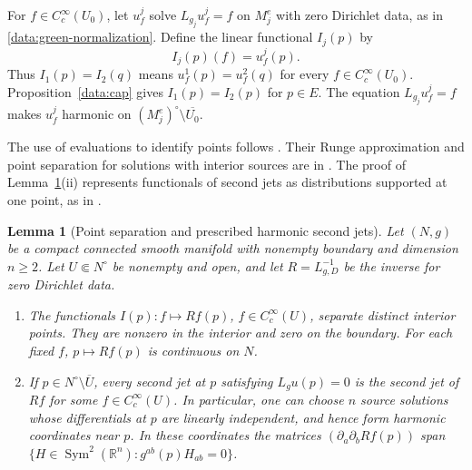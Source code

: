 \documentclass[11pt,a4paper]{article}
\newtheorem{lemma}[theorem]{Lemma}
\theoremstyle{definition}
\theoremstyle{remark}
\numberwithin{equation}{section}
\begin{document}
For $f\in C_c^\infty(U_0)$, let $u_f^j$ solve $L_{g_j}u_f^j=f$ on
$M_j^e$ with zero Dirichlet data, as in \eqref{data:green-normalization}.
Define the linear functional $I_j(p)$ by
\begin{equation}\label{data:evaluations}
 I_j(p)(f)=u_f^j(p).
\end{equation}
Thus $I_1(p)=I_2(q)$ means
$u_f^1(p)=u_f^2(q)$ for every $f\in C_c^\infty(U_0)$.
Proposition~\ref{data:cap} gives $I_1(p)=I_2(p)$ for $p\in E$.
The equation $L_{g_j}u_f^j=f$ makes $u_f^j$ harmonic on
$(M_j^e)^\circ\setminus\overline{U_0}$.

The use of evaluations to identify points follows
\citet[Definitions~2.1 and~6.1]{LLS20}. Their Runge approximation
and point separation for solutions with interior sources are in
\citep[Propositions~A.6 and~A.7]{LLS20}. The proof of
Lemma~\ref{data:jet-family}(ii) represents functionals of second
jets as distributions supported at one point, as in
\citep[Chapter~III, Section~3, proof of Theorem~6]{Malgrange1956}.

\begin{lemma}[Point separation and prescribed harmonic second jets]\label{data:jet-family}
Let $(N,g)$ be a compact connected smooth manifold with nonempty
boundary and dimension $n\ge2$. Let $U\Subset N^\circ$ be
nonempty and open, and let $R=L_{g,D}^{-1}$ be the inverse for
zero Dirichlet data.
\begin{enumerate}[label=\textup{(\roman*)}]
 \item The functionals $I(p):f\mapsto Rf(p)$,
       $f\in C_c^\infty(U)$, separate distinct interior points.
       They are nonzero in the interior and zero on the boundary.
       For each fixed $f$, $p\mapsto Rf(p)$ is continuous on $N$.
 \item If $p\in N^\circ\setminus\overline U$, every second jet at
       $p$ satisfying $L_g u(p)=0$ is the second jet of $Rf$ for
       some $f\in C_c^\infty(U)$. In particular, one can choose $n$
       source solutions whose differentials at $p$ are linearly
       independent, and hence form harmonic coordinates near $p$.
       In these coordinates the matrices
       $(\partial_a\partial_b Rf(p))$ span
       $\{H\in\operatorname{Sym}^2(\mathbb R^n):g^{ab}(p)H_{ab}=0\}$.
\end{enumerate}
\end{lemma}
\end{document}
